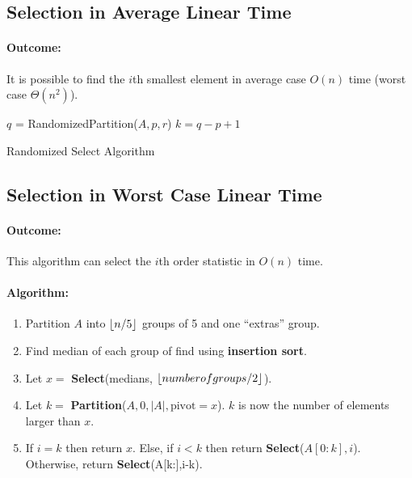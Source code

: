 \documentclass[a4paper,12pt]{report}
\DeclarePairedDelimiter{\floor}{\lfloor}{\rfloor}
\begin{document}
\subsection{Selection in Average Linear Time}

\paragraph{Outcome: } It is possible to find the $i$th smallest element in average case $O(n)$ time (worst case $\Theta(n^2)$).

\begin{algorithm}[H]
\SetAlgoLined
{}
	\BlankLine
	\BlankLine

	$q$ = RandomizedPartition($A,p,r$)\;
	$k = q-p+1$\;
	
	\caption{Randomized Select Algorithm}
\end{algorithm}

\subsection{Selection in Worst Case Linear Time}

\paragraph{Outcome: } This algorithm can select the $i$th order statistic in $O(n)$ time.

\paragraph{Algorithm: } 
\begin{enumerate}
\item Partition $A$ into $\floor{n/5}$ groups of 5 and one ``extras'' group.
\item Find median of each group of find using \textbf{insertion sort}.
\item Let $x = $ \textbf{Select}(medians, $\floor{number of groups/2}$).
\item Let $k = $ \textbf{Partition}($A, 0, |A|, \text{pivot}=x$). $k$ is now the number of elements larger than $x$.
\item If $i=k$ then return $x$. Else, if $i < k$ then return \textbf{Select}($A[0:k],i$). Otherwise, return \textbf{Select}(A[k:],i-k).
\end{enumerate}
\end{document}
